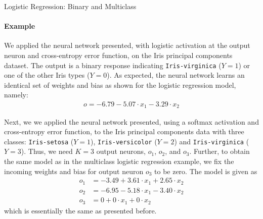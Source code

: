 %
\begin{frame}{Logistic Regression: Binary and Multiclass}
\framesubtitle{Example}
    We applied the neural network presented,
with logistic
    activation at the output neuron and cross-entropy error function, 
    on the Iris principal components dataset. The output is
a binary response indicating {\tt Iris-virginica} ($Y=1$) or one of
the other Iris types ($Y=0$). As expected, 
the neural network learns an identical set
of weights and bias as shown for the logistic regression model,
namely:
    \begin{align*}
        o = -6.79 -5.07 \cdot x_1 - 3.29 \cdot x_2
    \end{align*}




    Next, we we applied the neural network presented,
using a softmax
activation and cross-entropy error function,
to the Iris
principal components data with three classes: {\tt Iris-setosa}
($Y=1$), {\tt Iris-versicolor} ($Y=2$) and {\tt Iris-virginica}
($Y=3$). 
Thus, we need $K=3$ output neurons, $o_1$, $o_2$, and $o_3$.
Further, to obtain the
same model as in the multiclass logistic regression example,
we fix the incoming weights and bias for
output neuron $o_3$ to be zero. The model is given as
    \begin{align*}
        o_1 & = -3.49 + 3.61 \cdot x_1 + 2.65 \cdot x_2\\
        o_2 & = -6.95 -5.18 \cdot x_1 -3.40 \cdot x_2\\
        o_3 & = 0 + 0 \cdot x_1 + 0 \cdot x_2
    \end{align*}
which is essentially the same as presented before.
\end{frame}

